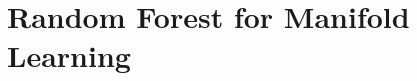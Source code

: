 \section{Random Forest for Manifold Learning}






% 





\begin{comment}
\paragraph{Heading level below subsubsection}
\label{sec:paragraph}

And I quote: 
%
\begin{quote}
La la la.
\end{quote}
%
\noindent No ident after end of quote.  

Another paragraph with a list:
%
\begin{itemize}
%  
\item Item 1
%
\item Item 2
%
\end{itemize}
%
\noindent Again, we don't indent here.
\end{comment}